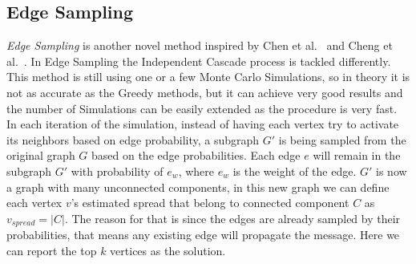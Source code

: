 \documentclass[english]{tktltiki}
\begin{document}
\subsection{Edge Sampling}
\textit{Edge Sampling} is another novel method inspired by Chen et al.\ \cite{chen09} and Cheng et al.\ \cite{cheng13}.
In Edge Sampling the Independent Cascade process is tackled differently. 
This method is still using one or a few Monte Carlo Simulations, so in theory it is not as accurate as the Greedy methods, but it can achieve very good results and the number of Simulations can be easily extended as the procedure is very fast. 
In each iteration of the simulation, instead of having each vertex try to activate its neighbors based on edge probability, a subgraph $G'$ is being sampled from the original graph $G$ based on the edge probabilities. 
Each edge $e$ will remain in the subgraph $G'$ with probability of $e_w$, where $e_w$ is the weight of the edge. 
$G'$ is now a graph with many unconnected components, in this new graph we can define each vertex $v$'s estimated spread that belong to connected component $C$ as $v_{spread} = |C|$.
The reason for that is since the edges are already sampled by their probabilities, that means any existing edge will propagate the message. Here we can report the top $k$ vertices as the solution.
\end{document}
